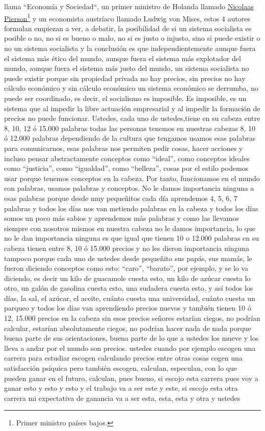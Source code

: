 llama ``Economía y Sociedad``\cite{weber1921economy}, un primer ministro de Holanda llamado \href{https://en.wikipedia.org/wiki/Nicolaas_Pierson}{Nicolaas Pierson}\footnote{Primer ministro países bajos.} y un economista austríaco llamado Ludwig von Mises, estos 4 autores formulan empiezan a ver, a debatir, la posibilidad de si un sistema socialista es posible o no, no si es bueno o malo, no si es justo o injusto, sino si puede existir o no un sistema socialista y la conclusión es que independientemente aunque fuera el sistema más ético del mundo, aunque fuera el sistema más explotador del mundo, aunque fuera el sistema más justo del mundo, un sistema socialista no puede existir porque sin propiedad privada no hay precios, sin precios no hay cálculo económico y sin cálculo económico un sistema económico se derrumba, no puede ser coordinado, es decir, el socialismo es imposible. Es imposible, es un sistema que al impedir la libre actuación empresarial y al impedir la formación de precios no puede funcionar. Ustedes, cada uno de ustedes,tiene en su cabeza entre 8, 10, 12 ó 15.000 palabras todas las personas tenemos en nuestras cabezas 8, 10 ó 12.000 palabras dependiendo de la cultura que tengamos usamos esas palabras para comunicarnos, esas palabras nos permiten pedir cosas, hacer acciones y incluso pensar abstractamente conceptos como \enquote{ideal}, como conceptos ideales como \enquote{justicia}, como \enquote{igualdad}, como \enquote{belleza}, cosas por el estilo podemos usar porque tenemos conceptos en la cabeza. Por tanto, funcionamos en el mundo con palabras, usamos palabras y conceptos. No le damos importancia ninguna a esas palabras porque desde muy pequeñitos cada día aprendemos 4, 5, 6, 7 palabras y todos los días nos van metiendo palabras en la cabeza y todos los días somos un poco más sabios y aprendemos más palabras y como las llevamos siempre con nosotros mismos en nuestra cabeza no le damos importancia, lo que no le dan importancia ninguna es que igual que tienen 10 o 12.000 palabras en su cabeza tienen entre 8, 10 ó 15.000 precios y no les dieron importancia ninguna tampoco porque cada uno de ustedes desde pequeñito sus papás, sus mamás, le fueron diciendo conceptos como esto: \enquote{caro}, \enquote{barato}, por ejemplo, y se lo va diciendo, es decir un kilo de guacamole cuesta esto, un kilo de azúcar cuesta lo otro, un galón de gasolina cuesta esto, una sudadera cuesta esto, y así todos los días, la sal, el azúcar, el aceite, cuánto cuesta una universidad, cuánto cuesta un parqueo y todos los días van aprendiendo precios nuevos y también tienen 10 ó 12, 15.000 precios en la cabeza sin esos precios señores estarían ciegos, no podrían calcular, estarían absolutamente ciegos, no podrían hacer nada de nada porque buena parte de sus orientaciones, buena parte de lo que a ustedes los mueve y los lleva a andar por el mundo son precios. ustedes cuando por ejemplo escogen una carrera para estudiar escogen calculando precios entre otras cosas cogen una satisfacción psíquica pero también escogen, calculan, especulan, con lo que pueden ganar en el futuro, calculan, pues bueno, si escojo esta carrera pues voy a ganar esto y esto y esto y el trabajo va a ser este y este, si escojo esta otra carrera mi expectativa de ganancia va a ser esta, esta, esta y otra y ustedes 